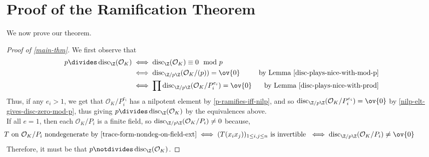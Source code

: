 \documentclass[11pt,leqno,oneside]{amsart}
\numberwithin{thm}{section}
\renewcommand{\O}{\mathcal{O}}
\newcommand{\disc}{\operatorname{disc}}
\begin{document}
\section{Proof of the Ramification Theorem}
We now prove our theorem.
\begin{proof}[Proof of \ref{main-thm}]
  We first observe that
  \begin{align*}
    p \divides \disc_\Z(\O_K)
    & \iff \disc_\Z(\O_K) \equiv 0 \mod p\\
    & \iff \disc_{\Z/p\Z}(\O_K/(p)) = \ov{0} & \text{by Lemma \ref{disc-plays-nice-with-mod-p}}\\
    & \iff \prod \disc_{\Z/p\Z}(\O_K/P_i^{e_i}) = \ov{0}
      & \text{by Lemma \ref{disc-plays-nice-with-prod}}
  \end{align*}
  Thus, if any \(e_i > 1\), we get that \(\O_K/P_i^{e_i}\) has a
  nilpotent element by \ref{p-ramifies-iff-nilp}, and so \(\disc_{\Z/p\Z}(\O_K/P_i^{e_i})
  = \ov{0}\) by \ref{nilp-elt-gives-disc-zero-mod-p}, thus giving \(p
  \divides \disc_\Z(\O_K)\) by the 
  equivalences above. \\

  If all \(e = 1\), then each \(\O_K/P_i\) is a finite field, so
  \(\disc_{\Z/p\Z}(\O_K/P_i) \neq 0\) because, \[
    \hspace{-0.5in} T \text{ on } \O_K/P_i \text{ nondegenerate by \ref{trace-form-nondeg-on-field-ext}} \iff (T(x_i
    x_j))_{1 \leq i,j \leq n} \text{ is invertible } \iff
    \disc_{\Z/p\Z}(\O_K/P_i) \neq \ov{0}
  \]
  Therefore, it must be that \(p \notdivides \disc_\Z(\O_K)\).
\end{proof}
\end{document}

